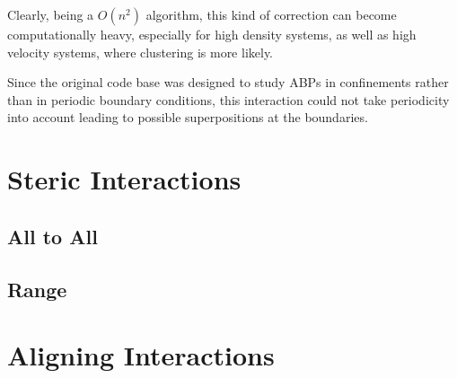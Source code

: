 \documentclass[../../master_thesis_np.tex]{subfiles}
\begin{document}
	Clearly, being a $O(n^2)$ algorithm, this kind of correction can become computationally heavy, especially for high density systems, as well as high velocity systems, where clustering is more likely.
	
	Since the original code base was designed to study ABPs in confinements rather than in periodic boundary conditions, this interaction could not take periodicity into account leading to possible superpositions at the boundaries.

	\section{Steric Interactions}
	\subsection{All to All}
	\subsection{Range}
	\section{Aligning Interactions}
\end{document}
